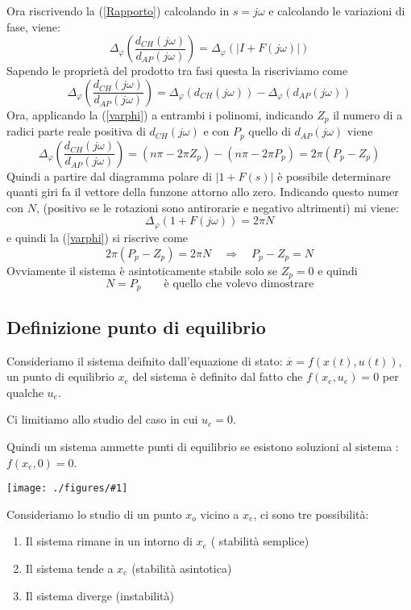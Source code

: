 \documentclass{article}
\newcommand{\incfig}[2]{%
	\texttt{[image: ./figures/\#1]}%
}
\begin{document}
Ora riscrivendo la (\ref{Rapporto}) calcolando in $s = j\omega$ e calcolando le variazioni di fase,
viene:
\[
\Delta_{\varphi}\left(\frac{d_{CH}(j\omega)}{d_{AP}(j\omega)} \right)= \Delta_{\varphi}\left(|I+F(j\omega)|\right)
\]
Sapendo le proprietà del prodotto tra fasi questa la riscriviamo come
\[
    \Delta_{\varphi}\left(\frac{d_{CH}(j\omega)}{d_{AP}(j\omega)} \right)=
    \Delta_{\varphi}(d_{CH}(j\omega))-\Delta_{\varphi}(d_{AP}(j\omega))
\]
Ora, applicando la (\ref{varphi}) a entrambi i polinomi, indicando $Z_p$ il numero di a radici parte reale positiva
di $d_{CH}(j\omega)$ e con $P_p$ quello di $d_{AP}(j\omega)$ viene
\[
    \Delta_{\varphi}\left(\frac{d_{CH}(j\omega)}{d_{AP}(j\omega)} \right)=
    (n\pi-2\pi Z_p)-(n\pi-2\pi P_p)=2\pi(P_p-Z_p )
\]
Quindi a partire dal diagramma polare di $|1+F(s)|$ è possibile determinare quanti giri 
fa il vettore della funzone attorno allo zero. Indicando questo numer con $N$,
(positivo se le rotazioni sono antirorarie e negativo altrimenti) mi viene:
\[
\Delta_{\varphi}(1+F(j\omega))=2\pi N    
\]
e quindi la (\ref{varphi}) si riscrive come 
\[
    2\pi(P_p-Z_p )=2\pi N \quad \Longrightarrow \quad P_p-Z_p = N
\]
Ovviamente il sistema è asintoticamente stabile solo se $Z_p=0$ e quindi 
\[N= P_p\quad\quad \text{è quello che volevo dimostrare}\]


\subsection{Definizione punto di equilibrio}
Consideriamo il sistema deifnito dall'equazione di stato: $ \overset{\cdot}{x} = f(x(t),u(t)) $, un punto di 
equilibrio $x_e$ del sistema è definito dal fatto che $f(x_e,u_e) = 0$ per qualche $u_e$.



Ci limitiamo allo studio del caso in cui $u_e = 0$.

Quindi un sistema ammette punti di equilibrio se esistono soluzioni al sistema :$f(x_e,0) = 0$.

\incfig{x_e.jpeg}{0.5}

Consideriamo lo studio di un punto $x_o$ vicino a $x_e$, ci sono tre possibilità:
\begin{enumerate}
    \item Il sistema rimane in un intorno di $x_e$ ( stabilità semplice)
    \item Il sistema tende a $x_e$ (stabilità asintotica)
    \item Il sistema diverge (instabilità)
\end{enumerate}
\end{document}
